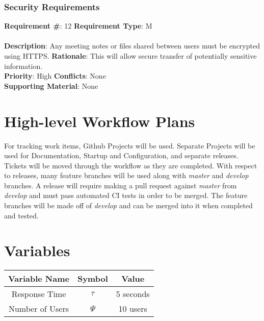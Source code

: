 \documentclass[11pt, oneside]{article}
\begin{document}
\subsubsection{Security Requirements}

\begin{framed}
	\noindent\textbf{Requirement \#}: 12 \hfill \textbf{Requirement Type}: M \hfill\\\\
	\noindent\textbf{Description}: Any meeting notes or files shared between users must be encrypted using HTTPS.
	\textbf{Rationale}: This will allow secure transfer of potentially sensitive information. \\
	\textbf{Priority}: High \hfill \textbf{Conflicts}: None \hfill\\
	\textbf{Supporting Material}: None\\
\end{framed}

\section{High-level Workflow Plans}
For tracking work items, Github Projects will be used. Separate Projects will be used for Documentation, Startup and Configuration, and separate releases. Tickets will be moved through the workflow as they are completed. With respect to releases, many feature branches will be used along with \textit{master} and \textit{develop} branches. A release will require making a pull request against \textit{master} from \textit{develop} and must pass automated CI tests in order to be merged. The feature branches will be made off of \textit{develop} and can be merged into it when completed and tested. 

\section{Variables}

\begin{center}
\begin{tabular}{ | c | c | c | }
 \hline Variable Name & Symbol & Value \\ \hline
 Response Time & $\tau$ & 5 seconds \\  
 Number of Users & $\Psi$ & 10 users \\ \hline
\end{tabular}
\end{center}
\end{document}
